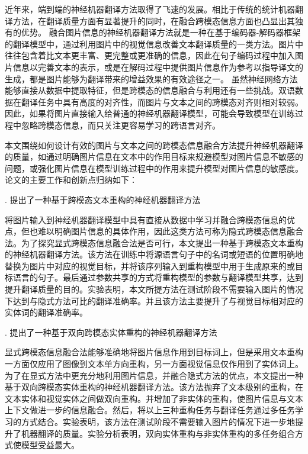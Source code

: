 近年来，端到端的神经机器翻译方法取得了飞速的发展。相比于传统的统计机器翻译方法，在翻译质量方面有显著提升的同时，在融合跨模态信息方面也凸显出其独有的优势。
融合图片信息的神经机器翻译方法就是一种在基于编码器-解码器框架的翻译模型中，通过利用图片中的视觉信息改善文本翻译质量的一类方法。图片中往往包含着比文本更丰富、更完整或更准确的信息，因此在句子编码过程中加入图片信息以完善文本的表示，或是在解码过程中提供图片信息作为参考以指导译文的生成，都是图片能够为翻译带来的增益效果的有效途径之一。
虽然神经网络方法能够直接从数据中提取特征，但是跨模态的信息融合与利用还有一些挑战。双语数据在翻译任务中具有高度的对齐性，而图片与文本之间的跨模态对齐则相对较弱。因此，如果将图片直接输入给普通的神经机器翻译模型，可能会导致模型在训练过程中忽略跨模态信息，而只关注更容易学习的跨语言对齐。

本文围绕如何设计有效的图片与文本之间的跨模态信息融合方法提升神经机器翻译的质量，如通过明确图片信息在文本中的作用目标来规避模型对图片信息不敏感的问题，或强化图片信息在模型训练过程中的作用来提升模型对图片信息的敏感度。论文的主要工作和创新点归纳如下：

{. 提出了一种基于跨模态文本重构的神经机器翻译方法}

将图片输入到神经机器翻译模型中具有直接从数据中学习并融合跨模态信息的优点，但也难以明确图片信息的具体作用，因此这类方法可称为隐式跨模态信息融合法。为了探究显式跨模态信息融合法是否可行，本文提出一种基于跨模态文本重构的神经机器翻译方法。该方法在训练中将源语言句子中的名词或短语的位置明确地替换为图片中对应的视觉目标，并将该序列输入到重构模型中用于生成原来的或目标语言的句子。最后通过参数共享的方式将重构模型的参数与翻译模型共享，达到提升翻译质量的目的。实验表明，本文所提方法在测试阶段不需要输入图片的情况下达到与隐式方法可比的翻译准确率。并且该方法主要提升了与视觉目标相对应的实体词的翻译准确率。

{. 提出了一种基于双向跨模态实体重构的神经机器翻译方法}

显式跨模态信息融合法能够准确地将图片信息作用到目标词上，但是采用文本重构一方面仅应用了图像到文本单方向重构，另一方面视觉信息仅作用到了实体词上。为了在显式方法中更充分地利用图片信息，并融合隐式方法的优点，本文提出一种基于双向跨模态实体重构的神经机器翻译方法。该方法抛弃了文本级别的重构，在文本实体和视觉实体之间做双向重构。并增加了非实体的重构，使图片信息与文本上下文做进一步的信息融合。然后，将以上三种重构任务与翻译任务通过多任务学习的方式结合。实验表明，该方法在测试阶段不需要输入图片的情况下进一步地提升了机器翻译的质量。实验分析表明，双向实体重构与非实体重构的多任务组合方式使模型受益最大。


